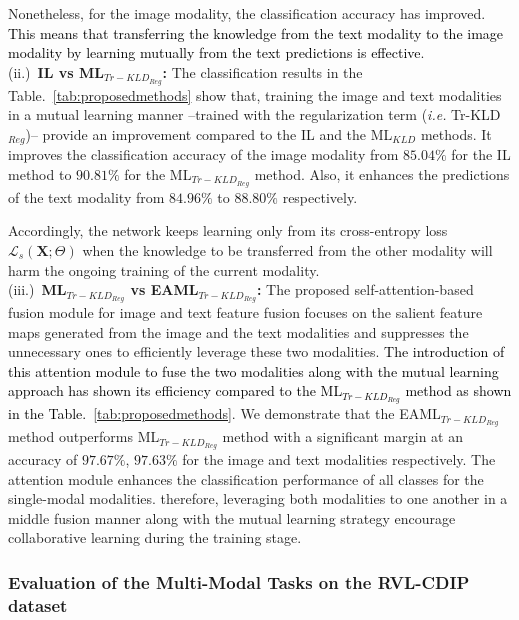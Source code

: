 \documentclass[twocolumn]{svjour3}
\newcommand{\ie}{\textit{i.e. }}
\begin{document}
Nonetheless, for the image modality, the classification accuracy has improved. \textcolor{black}{This means that transferring the knowledge from the text modality to the image modality by learning mutually from the text predictions is effective}.
\\
(ii.)\noindent~\textbf{IL vs ML$_{{Tr-KLD}_{Reg}}$:}
The classification results in the Table.~\ref{tab:proposedmethods} show that, training the image and text modalities in a mutual learning manner --trained with the regularization term (\ie Tr-KLD$_{Reg}$)-- provide an improvement compared to the IL and the ML$_{KLD}$ methods. It improves the classification accuracy of the image modality from $85.04\%$ for the IL method to $90.81\%$ for the ML$_{{Tr-KLD}_{Reg}}$ method. Also, it enhances the predictions of the text modality from $84.96\%$ to $88.80\%$ respectively.

Accordingly, the network keeps learning only from its cross-entropy loss $\mathcal{L}_{s}(\mathbf{X};\Theta)$ when the knowledge to be transferred from the other modality will harm the ongoing training of the current modality.
\\
(iii.)\noindent~\textbf{ML$_{{Tr-KLD}_{Reg}}$ vs EAML$_{{Tr-KLD}_{Reg}}$:}
The proposed self-attention-based fusion module for image and text feature fusion focuses on the salient feature maps generated from the image and the text modalities and suppresses the unnecessary ones to efficiently leverage these two modalities. \textcolor{black}{The introduction of this attention module to fuse the two modalities along with the mutual learning approach has shown its efficiency compared to the ML$_{{Tr-KLD}_{Reg}}$ method as shown in the Table.~\ref{tab:proposedmethods}}. We demonstrate that the EAML$_{{Tr-KLD}_{Reg}}$ method outperforms ML$_{{Tr-KLD}_{Reg}}$ method with a significant margin at an accuracy of $97.67\%$, $97.63\%$ for the image and text modalities respectively. The attention module enhances the classification performance of all classes for the single-modal modalities. therefore, leveraging both modalities to one another in a middle fusion manner along with the mutual learning strategy encourage collaborative learning during the training stage. 



\subsubsection{Evaluation of the Multi-Modal Tasks on the RVL-CDIP dataset}
\end{document}
